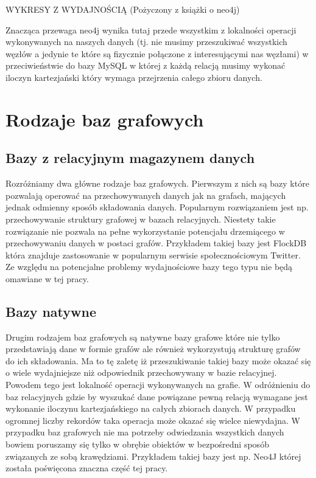\documentclass[brudnopis]{xmgr}
\begin{document}
WYKRESY Z WYDAJNOŚCIĄ (Pożyczony z książki o neo4j)

Znacząca przewaga neo4j wynika tutaj przede wszystkim z lokalności operacji wykonywanych na naszych danych (tj. nie musimy przeszukiwać wszystkich węzłów a jedynie te które są fizycznie połączone z interesującymi nas węzłami) w przeciwieństwie do bazy MySQL w której z każdą relacją musimy wykonać iloczyn kartezjański który wymaga przejrzenia całego zbioru danych.

\section{Rodzaje baz grafowych}

\subsection{Bazy z relacyjnym magazynem danych}

Rozróżniamy dwa główne rodzaje baz grafowych. Pierwszym z nich są bazy które pozwalają operować na przechowywanych danych jak na grafach, mających jednak odmienny sposób składowania danych. Popularnym rozwiązaniem jest np. przechowywanie struktury grafowej w bazach relacyjnych. Niestety takie rozwiązanie nie pozwala na pełne wykorzystanie potencjału drzemiącego w przechowywaniu danych w postaci grafów. Przykładem takiej bazy jest FlockDB która znajduje zastosowanie w popularnym serwisie społecznościowym Twitter. Ze względu na potencjalne problemy wydajnościowe bazy tego typu nie będą omawiane w tej pracy.

\subsection{Bazy natywne}
Drugim rodzajem baz grafowych są natywne bazy grafowe które nie tylko przedstawiają dane w formie grafów ale również wykorzystują strukturę grafów do ich składowania. Ma to tę zaletę iż przeszukiwanie takiej bazy może okazać się o wiele wydajniejsze niż odpowiednik przechowywany w bazie relacyjnej. Powodem tego jest lokalność operacji wykonywanych na grafie. W odróżnieniu do baz relacyjnych gdzie by wyszukać dane powiązane pewną relacją wymagane jest wykonanie iloczynu kartezjańskiego na całych zbiorach danych. W przypadku ogromnej liczby rekordów taka operacja może okazać się wielce niewydajna. W przypadku baz grafowych nie ma potrzeby odwiedzania wszystkich danych bowiem poruszamy się tylko w obrębie obiektów w bezpośredni sposób związanych ze sobą krawędziami. Przykładem takiej bazy jest np. Neo4J której została poświęcona znaczna część tej pracy.
\end{document}
